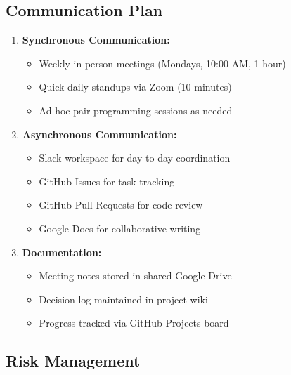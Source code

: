 \documentclass[11pt,a4paper]{article}
\begin{document}
\subsection{Communication Plan}

\begin{enumerate}[leftmargin=*]
    \item \textbf{Synchronous Communication:}
    \begin{itemize}
        \item Weekly in-person meetings (Mondays, 10:00 AM, 1 hour)
        \item Quick daily standups via Zoom (10 minutes)
        \item Ad-hoc pair programming sessions as needed
    \end{itemize}
    
    \item \textbf{Asynchronous Communication:}
    \begin{itemize}
        \item Slack workspace for day-to-day coordination
        \item GitHub Issues for task tracking
        \item GitHub Pull Requests for code review
        \item Google Docs for collaborative writing
    \end{itemize}
    
    \item \textbf{Documentation:}
    \begin{itemize}
        \item Meeting notes stored in shared Google Drive
        \item Decision log maintained in project wiki
        \item Progress tracked via GitHub Projects board
    \end{itemize}
\end{enumerate}

\subsection{Risk Management}
\end{document}
